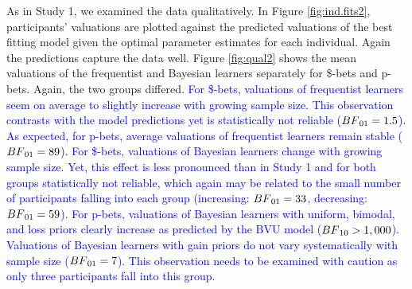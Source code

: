 \documentclass[a4paper, man, natbib, floatsintext]{apa6} %
\begin{document}
As in Study 1, we examined the data qualitatively. In Figure \ref{fig:ind.fits2}, participants' valuations are plotted against the predicted valuations of the best fitting model given the optimal parameter estimates for each individual. Again the predictions capture the data well. Figure \ref{fig:qual2} shows the mean valuations of the frequentist and Bayesian learners separately for \$-bets and p-bets. Again, the two groups differed. 
\textcolor{blue}{For \$-bets, valuations of frequentist learners seem on average to slightly increase with growing sample size. This observation contrasts with the model predictions yet is statistically not reliable ($BF\textsubscript{01} = 1.5$).  As expected, for p-bets, average valuations of frequentist learners remain stable ($BF\textsubscript{01} = 89$). For \$-bets, valuations of Bayesian learners change  with growing sample size. Yet, this effect is less pronounced than in Study 1 and for both groups statistically not reliable, which again may be related to the small number of participants falling into each group (increasing: $BF\textsubscript{01} = 33$, decreasing: $BF\textsubscript{01} = 59$). For p-bets, valuations of Bayesian learners with uniform, bimodal, and loss priors clearly increase as predicted by the BVU model ($BF\textsubscript{10} > 1,000$).
Valuations of Bayesian learners with gain priors do not vary systematically with sample size ($BF\textsubscript{01} = 7$). This observation needs to be examined with caution as only three participants fall into this group.}
\end{document}
